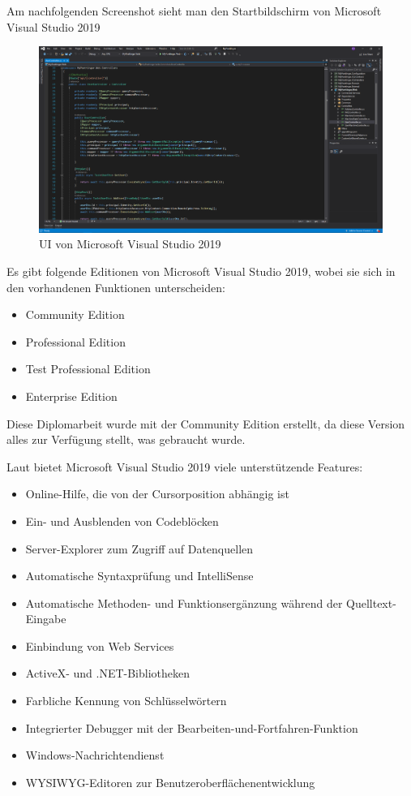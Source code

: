 Am nachfolgenden Screenshot sieht man den Startbildschirm von Microsoft Visual Studio 2019
\begin{figure}[h]
	\centerline{
		\includegraphics[width=1\textwidth, frame]{./grafiken/visual_studio_startview.png}
	}
	\vskip0pt
	\caption{UI von Microsoft Visual Studio 2019} \label{fig:visualStudioStartview}
\end{figure}

Es gibt folgende Editionen von Microsoft Visual Studio 2019, wobei sie sich in den vorhandenen Funktionen unterscheiden:
\begin{itemize}
	\item Community Edition
	\item Professional Edition
	\item Test Professional Edition
	\item Enterprise Edition
\end{itemize}

Diese Diplomarbeit wurde mit der Community Edition erstellt, da diese Version alles zur Verfügung stellt, was gebraucht wurde. \autocite{wikiVisualStudio}

Laut \autocite{wikiVisualStudio} bietet Microsoft Visual Studio 2019 viele unterstützende Features:

\begin{itemize}
	\item Online-Hilfe, die von der Cursorposition abhängig ist
	\item Ein- und Ausblenden von Codeblöcken
	\item Server-Explorer zum Zugriff auf Datenquellen
	\item Automatische Syntaxprüfung und IntelliSense
	\item Automatische Methoden- und Funktionsergänzung während der Quelltext-Eingabe
	\item Einbindung von Web Services
	\item ActiveX- und .NET-Bibliotheken
	\item Farbliche Kennung von Schlüsselwörtern
	\item Integrierter Debugger mit der Bearbeiten-und-Fortfahren-Funktion
	\item Windows-Nachrichtendienst
	\item WYSIWYG-Editoren zur Benutzeroberflächenentwicklung
\end{itemize}
